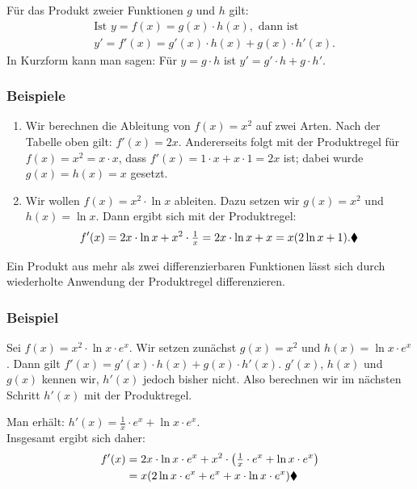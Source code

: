
Für das Produkt zweier Funktionen $g$ und $h$ gilt:
\begin{align*}
  &\text{Ist } y = f(x) = g(x) \cdot h(x), \text{ dann ist}\\
  &y' = f'(x) = g'(x) \cdot h(x) + g(x) \cdot h'(x) .
\end{align*}
In Kurzform kann man sagen: Für $y = g \cdot h$ ist $y' = g' \cdot h + g \cdot h'$.

\subsubsection{Beispiele}

\begin{enumerate}[label=\alph*)]
  \item Wir berechnen die Ableitung von $f(x) = x^2$ auf zwei Arten. Nach der Tabelle oben gilt: $f'(x) = 2x$. Andererseits folgt mit der Produktregel für $f(x) = x^2 = x \cdot x$, dass $f'(x) = 1 \cdot x + x \cdot 1 = 2x$ ist; dabei wurde $g(x) = h(x) = x$ gesetzt.
  \item Wir wollen $f(x) = x^2 \cdot \ln x$ ableiten. Dazu setzen wir $g(x) = x^2$ und $h(x) = \ln x$. Dann ergibt sich mit der Produktregel:
    \[ f'(x) = 2x \cdot \ln x + x^2 \cdot \tfrac{1}{x} = 2x \cdot \ln x + x = x (2\ln x + 1) .\beispielende \]
\end{enumerate}

Ein Produkt aus mehr als zwei differenzierbaren Funktionen lässt sich durch wiederholte Anwendung der Produktregel differenzieren.

\subsubsection{Beispiel}

Sei $f(x) = x^2 \cdot \ln x \cdot e^x$. Wir setzen zunächst $g(x) = x^2$ und $h(x) = \ln x \cdot e^x$. Dann gilt $f'(x) = g'(x) \cdot h(x) + g(x) \cdot h'(x)$. $g'(x)$, $h(x)$ und $g(x)$ kennen wir, $h'(x)$ jedoch bisher nicht. Also berechnen wir im nächsten Schritt $h'(x)$ mit der Produktregel.

Man erhält: $h'(x) = \tfrac{1}{x} \cdot e^x + \ln x \cdot e^x$.\\
Insgesamt ergibt sich daher:
\begin{align*}
  f'(x) &= 2x \cdot \ln x \cdot e^x + x^2 \cdot \left(\tfrac{1}{x} \cdot e^x + \ln x \cdot e^x\right)\\
  &= x (2 \ln x \cdot e^x + e^x + x \cdot \ln x \cdot e^x)\beispielende
\end{align*}

